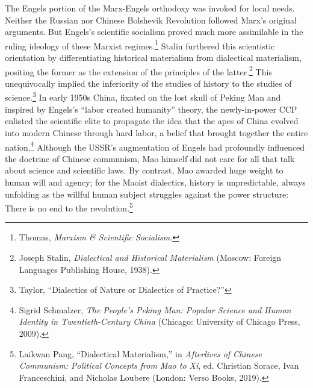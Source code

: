 \documentclass{tufte-handout}
\begin{document}
\begin{CJK*}{UTF8}{gbsn}
The Engels portion of the Marx-Engels orthodoxy was invoked for local
needs. Neither the Russian nor Chinese Bolshevik Revolution followed
Marx's original arguments. But Engels's scientific socialism proved much
more assimilable in the ruling ideology of these Marxist
regimes.\footnote{Thomas, \emph{Marxism \& Scientific Socialism}.}
Stalin furthered this scientistic orientation by differentiating
historical materialism from dialectical materialism, positing the former
as the extension of the principles of the latter.\footnote{Joseph
  Stalin, \emph{Dialectical and Historical Materialism} (Moscow: Foreign
  Languages Publishing House, 1938).} This unequivocally implied the
inferiority of the studies of history to the studies of
science.\footnote{Taylor, ``Dialectics of Nature or Dialectics of
  Practice?''} In early 1950s China, fixated on the lost skull of Peking
Man and inspired by Engels's ``labor created humanity'' theory, the
newly-in-power CCP enlisted the scientific elite to propagate the idea
that the apes of China evolved into modern Chinese through hard labor, a
belief that brought together the entire nation.\footnote{Sigrid
  Schmalzer, \emph{The People's Peking Man: Popular Science and Human
  Identity in Twentieth-Century China} (Chicago: University of Chicago
  Press, 2009).} Although the USSR's augmentation of Engels had
profoundly influenced the doctrine of Chinese communism, Mao himself did
not care for all that talk about science and scientific laws. By
contrast, Mao awarded huge weight to human will and agency; for the
Maoist dialectics, history is unpredictable, always unfolding as the
willful human subject struggles against the power structure: There is no
end to the revolution.\footnote{Laikwan Pang, ``Dialectical
  Materialism,'' in \emph{Afterlives of Chinese Communism: Political
  Concepts from Mao to Xi}, ed. Christian Sorace, Ivan Franceschini, and
  Nicholas Loubere (London: Verso Books, 2019).}


\end{CJK*}
\end{document}
